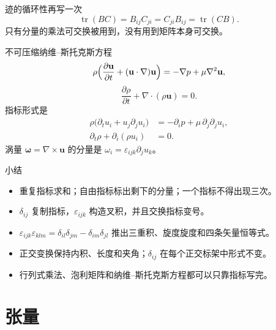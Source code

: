 \documentclass[fontset=windows, chinese, 10pt, xcolor=dvipsnames]{beamer}
\begin{document}
\begin{frame}{迹的循环性再写一次}
  \begin{equation*}
    \operatorname{tr}(BC)
    =B_{ij}C_{ji}
    =C_{ji}B_{ij}
    =\operatorname{tr}(CB).
  \end{equation*}
  只有分量的乘法可交换被用到，没有用到矩阵本身可交换。
\end{frame}

\begin{frame}{不可压缩纳维--斯托克斯方程}
  \begin{equation*}
    \rho\Bigl(
      \frac{\partial\mathbf{u}}{\partial t}
      +(\mathbf{u}\cdot\nabla)\mathbf{u}
    \Bigr)
    =-\nabla p+\mu\nabla^2\mathbf{u},
  \end{equation*}
  \begin{equation*}
    \frac{\partial\rho}{\partial t}
    +\nabla\cdot(\rho\mathbf{u})=0.
  \end{equation*}
  指标形式是
  \begin{align*}
    \rho\bigl(\partial_t u_i+u_j\partial_j u_i\bigr)
    &= -\partial_i p+\mu\,\partial_j\partial_j u_i,\\
    \partial_t\rho+\partial_i(\rho u_i)&=0.
  \end{align*}
  涡量 $\boldsymbol{\omega}=\nabla\times\mathbf{u}$ 的分量是
  $\omega_i=\varepsilon_{ijk}\partial_j u_k$。
\end{frame}

\begin{frame}{小结}
  \begin{itemize}
    \item 重复指标求和；自由指标标出剩下的分量；一个指标不得出现三次。
    \item $\delta_{ij}$ 复制指标，$\varepsilon_{ijk}$ 构造叉积，并且交换指标变号。
    \item $\varepsilon_{ijk}\varepsilon_{klm}=\delta_{il}\delta_{jm}-\delta_{im}\delta_{jl}$
      推出三重积、旋度旋度和四条矢量恒等式。
    \item 正交变换保持内积、长度和夹角；$\delta_{ij}$ 在每个正交标架中形式不变。
    \item 行列式乘法、泡利矩阵和纳维--斯托克斯方程都可以只靠指标写完。
  \end{itemize}
\end{frame}

\section{张量}
\end{document}
